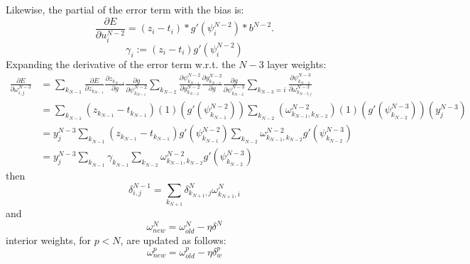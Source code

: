 \documentclass{article}
\begin{document}
%
Likewise, the partial of the error term with the bias is:
%
\begin{equation} \label{eq:d_bias}
\frac{\partial E}{\partial u_{i}^{N-2}} =
\left ( z_i - t_i \right ) *
g' (\psi_i^{N-2}) *
b^{N-2}.
\end{equation}
%
\begin{equation} \label{eq:gamma}
\gamma_i := (z_i - t_i) g'(\psi_i^{N-2})
\end{equation}
%
Expanding the derivative of the error term w.r.t. the $N-3$ layer weights:
%
\begin{equation} \label{eq:derive_du_nm1}
\begin{aligned}
\frac{\partial E}{\partial \omega_{i,j}^{N-3}} &= 
%
\sum_{k_{N-1}}
\frac{\partial E}{\partial z_{k_{N-1}}}
\frac{\partial z_{k_{N-1}}}{\partial g}
\frac{\partial g}{\partial \psi_{k_{N-1}}^{N-2}}
%
\sum_{k_{N-2}}
\frac{\partial \psi_{k_{N-1}}^{N-2}}{\partial y_{k_{N-2}}^{N-2}}
\frac{\partial y_{k_{N-2}}^{N-2}}{\partial g}
\frac{\partial g}{\partial \psi_{k_{N-2}}^{N-3}}
%
\sum_{k_{N-3}=i}
\frac{\partial \psi_{k_{N-2}}^{N-3}}{\partial \omega_{k_{N-3,j}}^{N-3}} \\
& = \sum_{k_{N-1}}
\left( z_{k_{N-1}} - t_{k_{N-1}} \right)
%
(1)
\left( g' \left( \psi_{k_{N-1}}^{N-2} \right) \right)
%
\sum_{k_{N-2}}
\left( \omega_{k_{N-1},k_{N-2}}^{N-2} \right)
(1)
\left( g' (\psi_{k_{N-2}}^{N-3}) \right)
\left( y_j^{N-3} \right) \\
& = y_j^{N-3} \sum_{k_{N-1}}
\left(z_{k_{N-1}} - t_{k_{N-1}}\right)
%
g' \left(\psi_{k_{N-1}}^{N-2}\right)
%
\sum_{k_{N-2}}
\omega_{k_{N-1},k_{N-2}}^{N-2}
g' \left( \psi_{k_{N-2}}^{N-3} \right) \\
& = y_j^{N-3} \sum_{k_{N-1}}
\gamma_{k_{N-1}}
%
\sum_{k_{N-2}}
\omega_{k_{N-1},k_{N-2}}^{N-2}
g' \left( \psi_{k_{N-2}}^{N-3} \right)
\end{aligned}
\end{equation}
%
then
%
\begin{equation} \label{eq:delta2}
\delta_{i,j}^{N-1} =
\sum_{k_{N+1}} \delta_{k_{N+1},j}^N \omega_{k_{N+1},i}^N
\end{equation}
%
and
%
\begin{equation} \label{eq:end_weights}
\omega_{new}^N = \omega_{old}^N - \eta \delta^N
\end{equation}
%
interior weights, for $p < N$, are updated as follows:
%
\begin{equation} \label{eq:w_weights}
\omega_{new}^p = \omega_{old}^p - \eta \delta_w^p
\end{equation}
\end{document}
